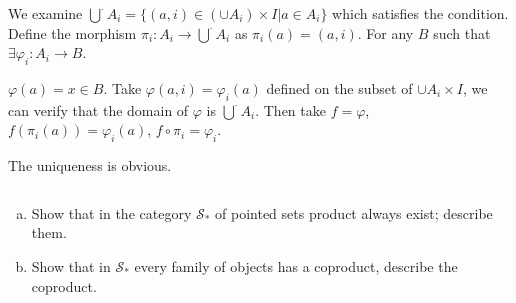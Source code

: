 \begin{answer}
    We examine $\bigcup\limits^{\cdot}A_{i}=\{(a,i)\in (\cup A_{i})\times I|a\in A_{i}\}$ which satisfies the condition. Define the morphism $\pi_{i}:A_{i}\to \bigcup\limits^{\cdot}A_{i}$ as $\pi_{i}(a)=(a,i)$. For any $B$ such that $\exists \varphi_{i}:A_{i}\to B$.
    
    \begin{figure}[H]\centering
    \end{figure}
    $\varphi(a)=x\in B$. Take $\varphi(a,i)=\varphi_{i}(a)$ defined on the subset of $\cup A_{i}\times I$, we can verify that the domain of $\varphi$ is $\bigcup\limits^{\cdot}A_{i}$. Then take $f=\varphi$, $f(\pi_{i}(a))=\varphi_{i}(a)$, $f\circ \pi_{i}=\varphi_{i}$.

    The uniqueness is obvious.
\end{answer}

$$ $$

\begin{ex}
    \begin{enumerate}[(a)]
        \item Show that in the category $\mathcal{S}_{*}$ of pointed sets product always exist; describe them.
        \item Show that in $\mathcal{S}_{*}$ every family of objects has a coproduct, describe the coproduct.
    \end{enumerate}
\end{ex}

